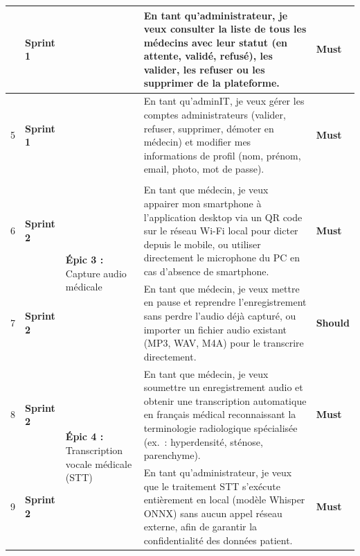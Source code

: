 \documentclass[12pt,a4paper]{article}
\newcommand{\must}{\textcolor{must}{\textbf{Must}}}
\newcommand{\should}{\textcolor{should}{\textbf{Should}}}
\newcommand{\sprintone}[1]{\cellcolor{sprint1bg}\textcolor{sprint1txt}{\textbf{#1}}}
\newcommand{\sprinttwo}[1]{\cellcolor{sprint2bg}\textcolor{sprint2txt}{\textbf{#1}}}
\begin{document}
\begin{longtable}{
  |>{\centering\arraybackslash}p{0.7cm}
  |>{\centering\arraybackslash}p{2.2cm}
  |p{3.8cm}
  |p{6.8cm}
  |>{\centering\arraybackslash}p{1.4cm}|
}
4 & \sprintone{Sprint 1} &
  & En tant qu'administrateur, je veux consulter la liste de tous les médecins avec leur statut (en attente, validé, refusé), les valider, les refuser ou les supprimer de la plateforme.
  & \must \\ \cline{1-2}\cline{4-5}

5 & \sprintone{Sprint 1} &
  & En tant qu'adminIT, je veux gérer les comptes administrateurs (valider, refuser, supprimer, démoter en médecin) et modifier mes informations de profil (nom, prénom, email, photo, mot de passe).
  & \must \\ \hline


\multicolumn{5}{|c|}{\cellcolor{sprint2bg}\textcolor{sprint2txt}{\Large\bfseries Sprint 2 — Transcription vocale \& Création / Correction de rapports}} \\ \hline

6 & \sprinttwo{Sprint 2}
  & \multirow{2}{3.8cm}{\textbf{Épic 3 :} Capture audio médicale}
  & En tant que médecin, je veux appairer mon smartphone à l'application desktop via un QR code sur le réseau Wi-Fi local pour dicter depuis le mobile, ou utiliser directement le microphone du PC en cas d'absence de smartphone.
  & \must \\ \cline{1-2}\cline{4-5}

7 & \sprinttwo{Sprint 2} &
  & En tant que médecin, je veux mettre en pause et reprendre l'enregistrement sans perdre l'audio déjà capturé, ou importer un fichier audio existant (MP3, WAV, M4A) pour le transcrire directement.
  & \should \\ \hline

8 & \sprinttwo{Sprint 2}
  & \multirow{2}{3.8cm}{\textbf{Épic 4 :} Transcription vocale médicale (STT)}
  & En tant que médecin, je veux soumettre un enregistrement audio et obtenir une transcription automatique en français médical reconnaissant la terminologie radiologique spécialisée (ex.~: hyperdensité, sténose, parenchyme).
  & \must \\ \cline{1-2}\cline{4-5}

9 & \sprinttwo{Sprint 2} &
  & En tant qu'administrateur, je veux que le traitement STT s'exécute entièrement en local (modèle Whisper ONNX) sans aucun appel réseau externe, afin de garantir la confidentialité des données patient.
  & \must \\ \hline


\end{longtable}
\end{document}
